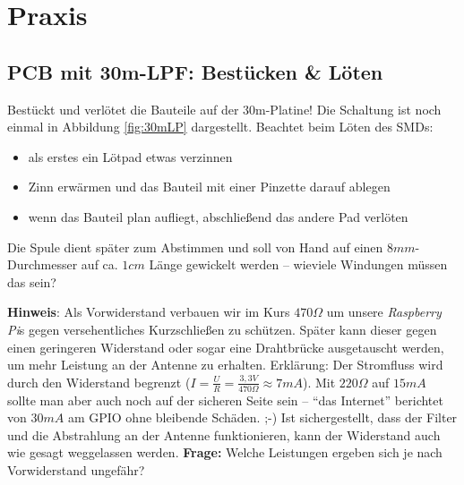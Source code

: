 \section*{Praxis}

\subsection*{PCB mit 30m-LPF: Bestücken \& Löten}

Bestückt und verlötet die Bauteile auf der 30m-Platine! Die Schaltung ist noch
einmal in Abbildung \ref{fig:30mLP} dargestellt. Beachtet beim Löten des SMDs:

\begin{itemize}
    \item als erstes ein Lötpad etwas verzinnen
    \item Zinn erwärmen und das Bauteil mit einer Pinzette darauf ablegen
    \item wenn das Bauteil plan aufliegt, abschließend das andere Pad verlöten
\end{itemize}



Die Spule dient später zum Abstimmen und soll von Hand auf einen
$8mm$-Durchmesser auf ca. $1cm$ Länge gewickelt werden -- wieviele Windungen
müssen das sein?

\textbf{Hinweis}: Als Vorwiderstand verbauen wir im Kurs $470 \Omega$ um unsere
\emph{Raspberry Pi}s gegen versehentliches Kurzschließen zu schützen. Später kann dieser
gegen einen geringeren Widerstand oder sogar eine Drahtbrücke ausgetauscht
werden, um mehr Leistung an der Antenne zu erhalten. Erklärung: Der Stromfluss
wird durch den Widerstand begrenzt ($I = \frac{U}{R} = \frac{3,3 V}{470 \Omega}
\approx 7 mA$). Mit $220 \Omega$ auf $15 mA$ sollte man aber auch noch auf der
sicheren Seite sein -- "`das Internet"' berichtet von $30 mA$ am GPIO ohne
bleibende Schäden. ;-) Ist sichergestellt, dass der Filter und die Abstrahlung
an der Antenne funktionieren, kann der Widerstand auch wie gesagt weggelassen
werden. \textbf{Frage:} Welche Leistungen ergeben sich je nach Vorwiderstand
ungefähr?

